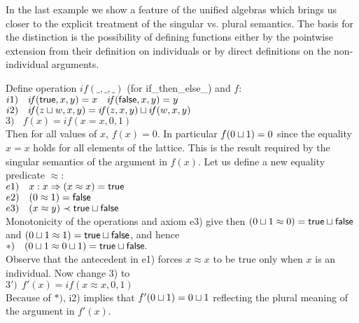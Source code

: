 {In the last example we show a feature of the unified algebras which brings us closer to the explicit 
treatment of the singular vs. plural semantics. The basis for the distinction is the possibility of defining 
functions either by the pointwise extension from their definition on individuals or by direct definitions on 
the non-individual arguments.
\begin{Example} 
Define operation $i\!f(\_,\_,\_)$ (for if\_then\_else\_) and $f:$ \\[1ex]
\hspace*{2em} $	i1)\ \ \   i\!f(\true, x, y)  =  x\ \ \ i\!f(\false,x,y)  =  y$ \\[.5ex]
\hspace*{2em} $	i2)\ \ \   i\!f(z\sqcup w, x, y)  =  i\!f(z,x,y) \sqcup  i\!f(w,x,y)$ \\[.5ex]
\hspace*{2em} $	3)\ \ \ \  f(x) = i\!f(x=x, 0, 1)$ \\[1ex]
Then for all values of $x$, $f(x)=0$. In particular $f(0\sqcup 1)=0$ since the equality $x=x$ holds for all elements 
of the lattice. This is the result required by the singular semantics of 
the argument in $f(x)$. 
Let us define a new equality predicate $\approx$: \\[1ex]
\hspace*{2em} $	e1)\ \ \ x:x \mathrel{\Rightarrow} (x\approx x) = {\sf true}	$ \\[.5ex]
\hspace*{2em} $	e2)\ \ \ (0\approx 1) = {\sf false} $ \\[.5ex]
\hspace*{2em} $	e3)\ \ \ (x\approx y) \mathrel{\prec} {\sf true} \sqcup {\sf false}$ \\[1ex]
Monotonicity of the operations and axiom e3) give then 
$ (0\sqcup 1 \approx 0) = {\sf true}\sqcup {\sf false}$ and $(0\sqcup 1 
\approx 1) = {\sf true} \sqcup {\sf false}$, 
and hence \\[1ex] \hspace*{2em}
$   *)\ \ \ (0\sqcup 1 \approx 0\sqcup 1) = {\sf true}\sqcup {\sf false}.$  \\[1ex]
Observe that the antecedent in e1) forces $x\approx x$ to be true only when $x$ is an individual. Now change 3) to \\[1ex]
\hspace*{2em}
$	3')\ \ f'(x) = i\!f(x\approx x, 0, 1) $ \\[1ex]
Because of $*)$, i2) implies that 
$f'(0\sqcup 1) = 0\sqcup 1$ reflecting the plural meaning of the argument  in $f'(x)$.
\end{Example}
 
}
